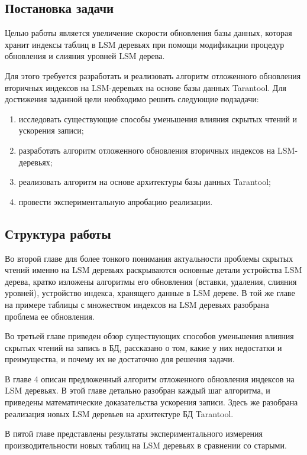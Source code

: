 \documentclass[a4paper,hidelinks,12pt]{article}
\begin{document}
\subsection{Постановка задачи}
Целью работы является увеличение скорости обновления базы данных, которая
хранит индексы таблиц в LSM деревьях при помощи модификации процедур обновления
и слияния уровней LSM дерева.

Для этого требуется разработать и реализовать алгоритм отложенного обновления
вторичных индексов на LSM-деревьях на основе базы данных Tarantool. Для
достижения заданной цели необходимо решить следующие подзадачи:
\begin{enumerate}
\item исследовать существующие способы уменьшения влияния скрытых чтений и
      ускорения записи;
\item разработать алгоритм отложенного обновления вторичных индексов на
      LSM-деревьях;
\item реализовать алгоритм на основе архитектуры базы данных Tarantool;
\item провести экспериментальную апробацию реализации.
\end{enumerate}

\subsection{Структура работы}
Во второй главе для более тонкого понимания актуальности проблемы скрытых чтений
именно на LSM деревьях раскрываются основные детали устройства LSM дерева,
кратко изложены алгоритмы его обновления (вставки, удаления, слияния уровней),
устройство индекса, хранящего данные в LSM дереве. В той же главе на примере
таблицы с множеством индексов на LSM деревьях разобрана проблема ее обновления.

Во третьей главе приведен обзор существующих способов уменьшения влияния скрытых
чтений на запись в БД, рассказано о том, какие у них недостатки и преимущества,
и почему их не достаточно для решения задачи.

В главе 4 описан предложенный алгоритм отложенного обновления индексов на LSM
деревьях. В этой главе детально разобран каждый шаг алгоритма, и приведены
математические доказательства ускорения записи. Здесь же разобрана реализация
новых LSM деревьев на архитектуре БД Tarantool.

В пятой главе представлены результаты экспериментального измерения
производительности новых таблиц на LSM деревьях в сравнении со старыми.
\end{document}
